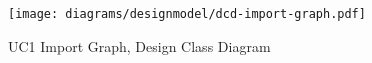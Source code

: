 \begin{figure}[p]%
\end{figure}
\begin{figure}[H]
    \centering
    \texttt{[image: diagrams/designmodel/dcd-import-graph.pdf]}
    \caption{UC1 Import Graph, Design Class Diagram}
    \label{fig:import-graph-dcd}
\end{figure}
\newpage
% 

